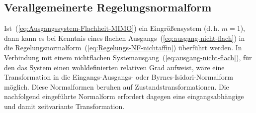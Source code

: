 \subsection{Verallgemeinerte Regelungsnormalform\label{subsec:Verallgemeinerte-Regelungsnormalform}}

Ist~(\ref{eq:Ausgangssystem-Flachheit-MIMO}) ein Eingrößensystem
(d.\,h. $m=1$), dann kann es bei Kenntnis eines flachen Ausgangs~(\ref{eq:ausgang-nicht-flach})
in die Regelungsnormalform~(\ref{eq:Regelungs-NF-nichtaffin}) überführt
werden. In Verbindung mit einem nichtflachen Systemausgang~(\ref{eq:ausgang-nicht-flach}),
für den das System einen wohldefinierten relativen Grad aufweist,
wäre eine Transformation in die Eingangs-Ausgangs- oder Byrnes-Isidori-Normalform
möglich. Diese Normalformen beruhen auf Zustandstransformationen.
Die nachfolgend eingeführte Normalform erfordert dagegen eine eingangsabhängige
und damit zeitvariante Transformation.

